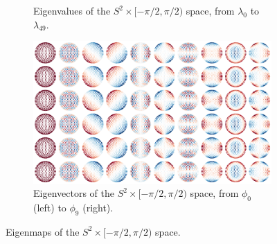 \documentclass{article}
\begin{document}
\begin{figure}[h!]
    \centering
    \begin{subfigure}[b]{0.9\textwidth}
        \centering
        \caption{Eigenvalues of the $S^2 \times [-\pi/2, \pi/2)$ space, from $\lambda_0$ to $\lambda_{49}$.}
    \end{subfigure}
    \hfill
    \begin{subfigure}[b]{\textwidth}
        \centering
        \includegraphics[width=\textwidth]{Images/so3_eigenvecs.png}
        \caption{Eigenvectors of the $S^2 \times [-\pi/2, \pi/2)$ space, from $\phi_0$ (left) to $\phi_9$ (right).}
    \end{subfigure}
    \caption{Eigenmaps of the $S^2 \times [-\pi/2, \pi/2)$ space.}
    \label{fig:so3_eigenmaps}
\end{figure}
\end{document}
